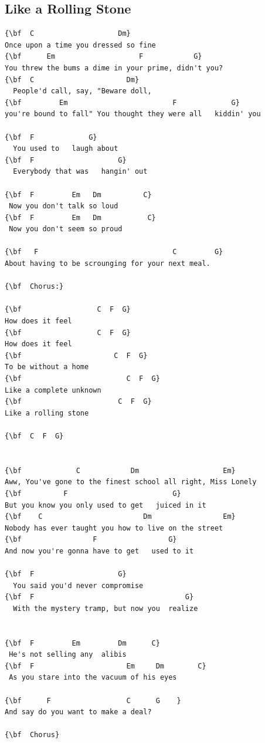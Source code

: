 \documentclass[a4paper]{article}
\begin{document}
\subsection{Like a Rolling Stone}
\begin{Verbatim}[commandchars=\\\{\}]
{\bf  C                    Dm}
Once upon a time you dressed so fine
{\bf      Em                    F            G}
You threw the bums a dime in your prime, didn't you?
{\bf  C                      Dm}
  People'd call, say, "Beware doll, 
{\bf         Em                         F             G}
you're bound to fall" You thought they were all   kiddin' you

{\bf  F             G}
  You used to   laugh about
{\bf  F                    G}
  Everybody that was   hangin' out

{\bf  F         Em   Dm          C}
 Now you don't talk so loud
{\bf  F         Em   Dm           C}
 Now you don't seem so proud

{\bf   F                                C         G}
About having to be scrounging for your next meal.

{\bf  Chorus:}

{\bf                  C  F  G}
How does it feel
{\bf                  C  F  G}
How does it feel
{\bf                      C  F  G}
To be without a home
{\bf                         C  F  G}
Like a complete unknown
{\bf                       C  F  G}
Like a rolling stone

{\bf  C  F  G}


{\bf             C            Dm                    Em}
Aww, You've gone to the finest school all right, Miss Lonely
{\bf          F                         G}
But you know you only used to get   juiced in it
{\bf    C                        Dm                 Em}
Nobody has ever taught you how to live on the street
{\bf                 F                 G}
And now you're gonna have to get   used to it

{\bf  F                    G}
  You said you'd never compromise
{\bf  F                                    G}
  With the mystery tramp, but now you  realize


{\bf  F         Em         Dm      C}
 He's not selling any  alibis
{\bf  F                      Em     Dm        C}
 As you stare into the vacuum of his eyes

{\bf      F                  C      G    }
And say do you want to make a deal?

{\bf  Chorus}


\end{Verbatim}
\end{document}
